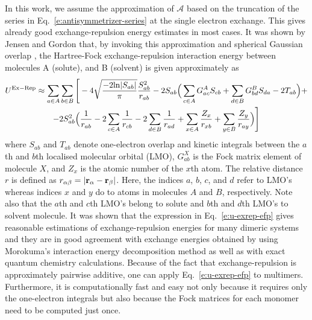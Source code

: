 \documentclass[a4paper,titlepage,twoside,fleqn,12pt]{book}
\begin{document}
\begin{refsection}
In this work, we assume the approximation of $\mathscr{A}$
based on the truncation of the series in Eq.~\eqref{e:antisymmetrizer-series}
at the single electron exchange. This gives already good exchange\hyp{}repulsion
energy estimates in most cases. It was shown by 
Jensen and Gordon \citep{Jensen.Gordon.JCP.1998,Jensen.Gordon.MolPhys.1996}
that, by invoking this
approximation and spherical Gaussian overlap \citep{Jensen.JCP.1996}, 
the Hartree\hyp{}Fock exchange\hyp{}repulsion interaction energy 
between molecules A (solute), and B (solvent) is given approximately as 
%
\begin{multline}\label{e:u-exrep-efp}
U^{\rm Ex-Rep} \approx \sum_{a \in A}\sum_{b \in B} \Bigg[
-4\sqrt{\frac{-2{\rm ln}|S_{ab}|}{\pi}} \frac{S_{ab}^2}{r_{ab}} 
-
2S_{ab} \Big( \sum_{c \in A} G^A_{ac} S_{cb} + 
\sum_{d \in B} G^B_{bd} S_{da} - 2 T_{ab} \Big) + \\
-2S^2_{ab} \Big( \frac{1}{r_{ab}} 
- 2\sum_{c \in A} \frac{1}{r_{cb}} 
- 2\sum_{d \in B} \frac{1}{r_{ad}}
+ \sum_{x \in A} \frac{Z_x}{r_{xb}} 
+ \sum_{y \in B} \frac{Z_y}{r_{ay}}  
\Big)
\Bigg]
\end{multline}
%
where $S_{ab}$ and $T_{ab}$ denote one\hyp{}electron overlap and kinetic integrals 
between the $a$th and $b$th localised molecular orbital (LMO), 
$G^X_{ab}$ is the Fock matrix element of molecule 
$X$, and $Z_x$ is the atomic number of the $x$th atom. 
The relative distance $r$ is defined as $r_{\alpha\beta} = \left|{\bf r}_\alpha - {\bf r}_\beta \right|$. 
Here, the indices $a$, $b$, $c$, and $d$ refer to LMO's whereas indices $x$ and $y$ 
do to atoms in molecules $A$ and $B$, respectively. Note also that the $a$th 
and $c$th LMO's belong to solute and $b$th and $d$th LMO's to solvent molecule. 
It was shown \citep{Jensen.Gordon.JCP.1998,Jensen.Gordon.MolPhys.1996,Kemp.Rintelman.Gordon.Jensen.TheoretChemAcc.2009} 
that the expression in Eq.~\eqref{e:u-exrep-efp} gives reasonable 
estimations of exchange\hyp{}repulsion energies for many dimeric systems 
and they are in good agreement with exchange energies obtained 
by using Morokuma's interaction energy decomposition 
method \citep{Kitaura.Morokuma.IJQC.1976} 
as well as 
with exact quantum chemistry calculations. Because of the fact that 
exchange\hyp{}repulsion is approximately pairwise 
additive, \citep{Chen.Li.JPCA.2010,Chen.Gordon.JCP.1996,Jens.Bruske.Grimme.PCCP.2009,
Gora.Sokalski.Leszczynski.Pett.JPCB.2005,Chaudret.Gresh.Parisel.Piquemel.JCC.2011} 
one can 
apply Eq.~\eqref{e:u-exrep-efp} to multimers. Furthermore, it is computationally fast 
and easy not only because it requires only the one\hyp{}electron integrals 
but also because the Fock matrices for each monomer need to be computed just once.


\end{refsection}
\end{document}
